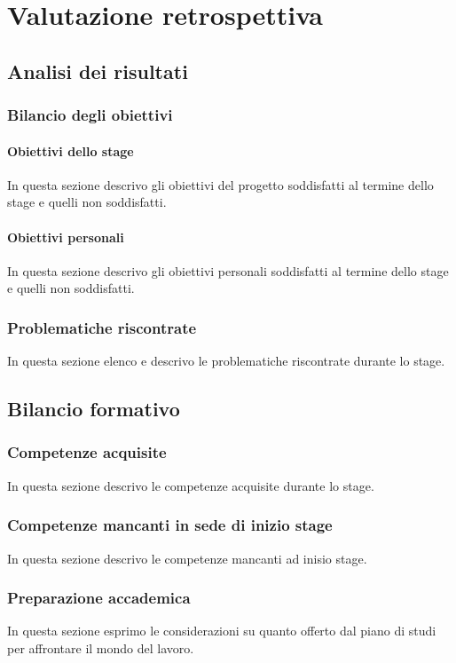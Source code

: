 
\chapter{Valutazione retrospettiva}
\label{cap:valutazione}
\section{Analisi dei risultati}

\subsection{Bilancio degli obiettivi}

\subsubsection{Obiettivi dello stage}
In questa sezione descrivo gli obiettivi del progetto soddisfatti al termine dello stage e quelli non soddisfatti.

\subsubsection{Obiettivi personali}
In questa sezione descrivo gli obiettivi personali soddisfatti al termine dello stage e quelli non soddisfatti.

\subsection{Problematiche riscontrate}
In questa sezione elenco e descrivo le problematiche riscontrate durante lo stage.

\section{Bilancio formativo}

\subsection{Competenze acquisite}
In questa sezione descrivo le competenze acquisite durante lo stage.

\subsection{Competenze mancanti in sede di inizio stage}
In questa sezione descrivo le competenze mancanti ad inisio stage.

\subsection{Preparazione accademica}
In questa sezione esprimo le considerazioni su quanto offerto dal piano di studi per affrontare il mondo del lavoro.